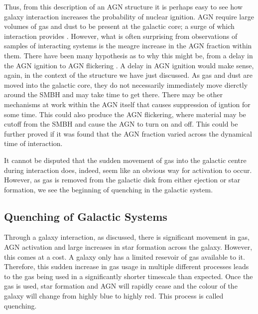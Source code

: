 Thus, from this description of an AGN structure it is perhaps easy to see how galaxy interaction increases the probability of nuclear ignition. AGN require large volumes of gas and dust to be present at the galactic core; a surge of which interaction provides \citep[][provides an excellent summary of this process from the point of view of simulations]{2008ApJS..175..356H}. However, what is often surprising from observations of samples of interacting systems is the meagre increase in the AGN fraction within them. There have been many hypothesis as to why this might be, from a delay in the AGN ignition \citep{2011MNRAS.418.2043E} to AGN flickering \citep{2015MNRAS.451.2517S}. A delay in AGN ignition would make sense, again, in the context of the structure we have just discussed. As gas and dust are moved into the galactic core, they do not necessarily immediately move dierctly around the SMBH and may take time to get there. There may be other mechanisms at work within the AGN itself that causes suppression of igntion for some time. This could also produce the AGN flickering, where material may be cutoff from the SMBH and cause the AGN to turn on and off. This could be further proved if it was found that the AGN fraction varied across the dynamical time of interaction.

It cannot be disputed that the sudden movement of gas into the galactic centre during interaction does, indeed, seem like an obvious way for activation to occur. However, as gas is removed from the galactic disk from either ejection or star formation, we see the beginning of quenching in the galactic system. 

\subsection{Quenching of Galactic Systems}
\noindent Through a galaxy interaction, as discussed, there is significant movement in gas, AGN activation and large increases in star formation across the galaxy. However, this comes at a cost. A galaxy only has a limited resevoir of gas available to it. Therefore, this sudden increase in gas usage in multiple different processes leads to the gas being used in a significantly shorter timescale than expected. Once the gas is used, star formation and AGN will rapidly cease and the colour of the galaxy will change from highly blue to highly red. This process is called quenching.

